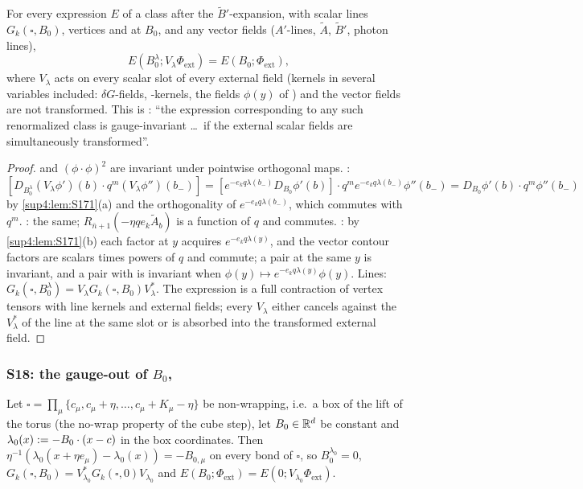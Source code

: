 \begin{lemma}\label{sup4:lem:S172}
For every expression $E$ of a class after the $\tilde B'$-expansion, with scalar lines $G_k(\square,B_0)$, vertices \cite[(1.6)--(1.11)]{Ba3} and \cite[(1.13)--(1.15)]{Ba3} at $B_0$, and any vector fields ($A'$-lines, $\tilde A$, $\tilde B'$, photon lines),
\[
E(B_0^\lambda;V_\lambda\Phi_{\mathrm{ext}})=E(B_0;\Phi_{\mathrm{ext}}),
\]
where $V_\lambda$ acts on every scalar slot of every external field (kernels in several variables included: $\delta G$-fields, \cite[(1.16)]{Ba3}-kernels, the fields $\phi(y)$ of \cite[(1.12)]{Ba3}) and the vector fields are not transformed. This is \cite[p.~433]{Ba3}: ``the expression corresponding to any such renormalized class is gauge-invariant \dots\ if the external scalar fields are simultaneously transformed''.
\end{lemma}

\begin{proof}
\cite[(1.6), (1.7)]{Ba3} and $(\phi\cdot\phi)^2$ are invariant under pointwise orthogonal maps. \cite[(1.8)]{Ba3}: $[D_{B_0^\lambda}(V_\lambda\phi')(b)\cdot q^m(V_\lambda\phi'')(b_-)]=[e^{-e_kq\lambda(b_-)}D_{B_0}\phi'(b)]\cdot q^me^{-e_kq\lambda(b_-)}\phi''(b_-)=D_{B_0}\phi'(b)\cdot q^m\phi''(b_-)$ by \cref{sup4:lem:S171}(a) and the orthogonality of $e^{-e_kq\lambda(b_-)}$, which commutes with $q^m$. \cite[(1.9)--(1.11)]{Ba3}: the same; $R_{\bar n+1}(-\eta qe_k\tilde A_b)$ is a function of $q$ and commutes. \cite[(1.13)--(1.15)]{Ba3}: by \cref{sup4:lem:S171}(b) each factor at $y$ acquires $e^{-e_kq\lambda(y)}$, and the vector contour factors are scalars times powers of $q$ and commute; a pair at the same $y$ is invariant, and a pair with \cite[(1.12)]{Ba3} is invariant when $\phi(y)\mapsto e^{-e_kq\lambda(y)}\phi(y)$. Lines: $G_k(\square,B_0^\lambda)=V_\lambda G_k(\square,B_0)V_\lambda^*$. The expression is a full contraction of vertex tensors with line kernels and external fields; every $V_\lambda$ either cancels against the $V_\lambda^*$ of the line at the same slot or is absorbed into the transformed external field.
\end{proof}

\subsubsection*{S18: the gauge-out of $B_0$, \cite[p.~433]{Ba3}}

\begin{lemma}\label{sup4:lem:S18}
Let $\square=\prod_\mu\{c_\mu,c_\mu+\eta,\dots,c_\mu+K_\mu-\eta\}$ be non-wrapping, i.e.\ a box of the lift of the torus (the no-wrap property of the cube step), let $B_0\in\mathbb R^d$ be constant and $\lambda_0(x):=-B_0\cdot(x-c)$ in the box coordinates. Then $\eta^{-1}(\lambda_0(x+\eta e_\mu)-\lambda_0(x))=-B_{0,\mu}$ on every bond of $\square$, so $B_0^{\lambda_0}=0$, $G_k(\square,B_0)=V_{\lambda_0}^*G_k(\square,0)V_{\lambda_0}$ and $E(B_0;\Phi_{\mathrm{ext}})=E(0;V_{\lambda_0}\Phi_{\mathrm{ext}})$.
\end{lemma}

